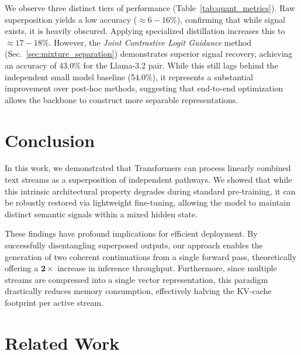 \documentclass{article}
\theoremstyle{plain}
\theoremstyle{definition}
\theoremstyle{remark}
\begin{document}
We observe three distinct tiers of performance (Table~\ref{tab:quant_metrics}). Raw superposition yields a low accuracy ($\approx 6-16\%$), confirming that while signal exists, it is heavily obscured. Applying specialized distillation increases this to $\approx 17-18\%$. However, the \textit{Joint Contrastive Logit Guidance} method (Sec.~\ref{sec:mixture_separation}) demonstrates superior signal recovery, achieving an accuracy of 43.0\% for the Llama-3.2 pair. While this still lags behind the independent small model baseline (54.0\%), it represents a substantial improvement over post-hoc methods, suggesting that end-to-end optimization allows the backbone to construct more separable representations.

\section{Conclusion}

In this work, we demonstrated that Transformers can process linearly combined text streams as a superposition of independent pathways. We showed that while this intrinsic architectural property degrades during standard pre-training, it can be robustly restored via lightweight fine-tuning, allowing the model to maintain distinct semantic signals within a mixed hidden state.

These findings have profound implications for efficient deployment. By successfully disentangling superposed outputs, our approach enables the generation of two coherent continuations from a single forward pass, theoretically offering a $\mathbf{2\times}$ increase in inference throughput. Furthermore, since multiple streams are compressed into a single vector representation, this paradigm drastically reduces memory consumption, effectively halving the KV-cache footprint per active stream.

\section{Related Work}
\end{document}
